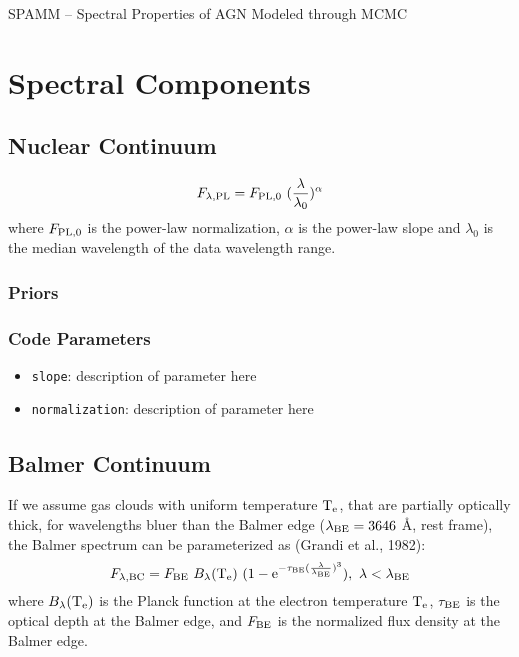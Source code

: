 \documentclass[12pt,letterpaper]{article}
\begin{document}
\begin{center}
{\large SPAMM -- Spectral Properties of AGN Modeled through MCMC }
\end{center}
\vspace{0.05in}

\section*{Spectral Components}

\subsection*{Nuclear Continuum}
\begin{equation}
F_{\lambda,{\rm PL}}=F_{\rm PL,0} \ (\frac{\lambda}{\lambda_0})^{\alpha} 
\end{equation}
where $F_{\rm PL,0}$ is the power-law normalization, $\alpha$ is the power-law slope and $\lambda_0$ is the median wavelength 
of the data wavelength range. 
\subsubsection*{Priors}

\subsubsection*{Code Parameters}

\begin{itemize}
    \item {\tt slope}: description of parameter here
    \item {\tt normalization}: description of parameter here
\end{itemize}

\subsection*{Balmer Continuum}
If we assume gas clouds with uniform temperature $\rm{T}_{\rm{e}}$, that are partially optically thick, for wavelengths bluer 
than the Balmer edge ($\lambda_{\rm{BE}}=3646$ \AA, rest frame), the Balmer spectrum can be parameterized as 
(Grandi et al., 1982): 
\begin{equation}
F_{\lambda,{\rm BC}}= F_{{\rm BE}} \ B_{\lambda}({\rm T}_{{\rm e}}) \ (1-{\rm e}^{-\tau_{{\rm BE}}(\frac{\lambda}{\lambda_{{\rm BE}}})^3}), \ \lambda<\lambda_{\rm{BE}}
\end{equation}
where $B_{\lambda}({\rm T}_{{\rm e}})$ is the Planck function at the electron temperature 
${\rm T}_{{\rm e}}$, $\tau_{{\rm BE}}$ is the optical 
depth at the Balmer edge, and $F_{{\rm BE}}$ is the normalized flux density at the Balmer edge.
\end{document}
